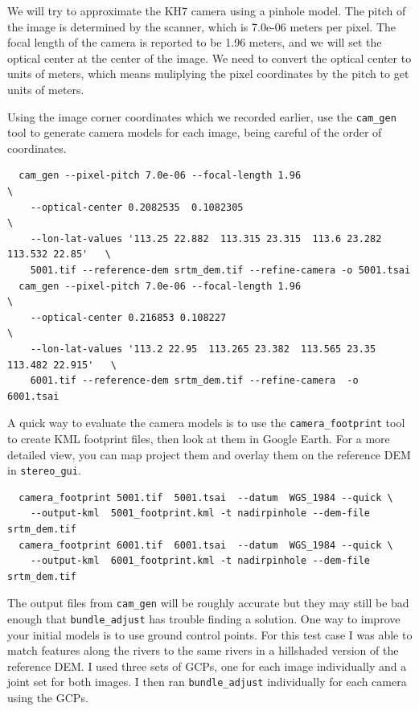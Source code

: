 We will try to approximate the KH7 camera using a pinhole model.
The pitch of the image is determined by the scanner, which is 7.0e-06 meters per pixel.
The focal length of the camera is reported to be 1.96 meters, and we will set the optical
center at the center of the image.  We need to convert the optical center to units of meters,
which means muliplying the pixel coordinates by the pitch to get units of meters.

Using the image corner coordinates which we recorded earlier, use the \texttt{cam\_gen}
tool to generate camera models for each image, being careful of the order of coordinates.

\begin{verbatim}
  cam_gen --pixel-pitch 7.0e-06 --focal-length 1.96                                 \
    --optical-center 0.2082535  0.1082305                                           \
    --lon-lat-values '113.25 22.882  113.315 23.315  113.6 23.282  113.532 22.85'   \
    5001.tif --reference-dem srtm_dem.tif --refine-camera -o 5001.tsai
  cam_gen --pixel-pitch 7.0e-06 --focal-length 1.96                                 \
    --optical-center 0.216853 0.108227                                              \
    --lon-lat-values '113.2 22.95  113.265 23.382  113.565 23.35  113.482 22.915'   \
    6001.tif --reference-dem srtm_dem.tif --refine-camera  -o 6001.tsai
\end{verbatim}


A quick way to evaluate the camera models is to use the \texttt{camera\_footprint} tool to
create KML footprint files, then look at them in Google Earth.  For a more detailed view,
you can map project them and overlay them on the reference DEM in \texttt{stereo\_gui}.

\begin{verbatim}
  camera_footprint 5001.tif  5001.tsai  --datum  WGS_1984 --quick \
    --output-kml  5001_footprint.kml -t nadirpinhole --dem-file srtm_dem.tif
  camera_footprint 6001.tif  6001.tsai  --datum  WGS_1984 --quick \
    --output-kml  6001_footprint.kml -t nadirpinhole --dem-file srtm_dem.tif
\end{verbatim}

The output files from \texttt{cam\_gen} will be roughly accurate but they may still be bad
enough that \texttt{bundle\_adjust} has trouble finding a solution.  One way to improve your
initial models is to use ground control points.  For this test case I was able to match
features along the rivers to the same rivers in a hillshaded version of the reference DEM.
I used three sets of GCPs, one for each image individually and a joint set for both images.
I then ran \texttt{bundle\_adjust} individually for each camera using the GCPs.

